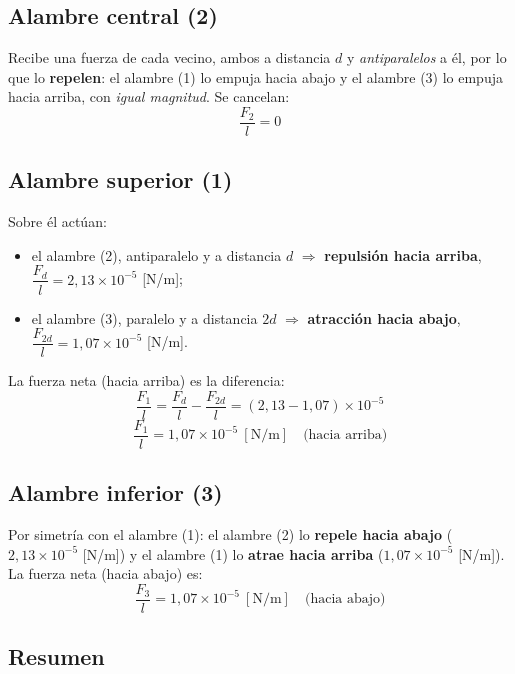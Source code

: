 \documentclass[12pt,letterpaper]{article}
\begin{document}
\subsection*{Alambre central (2)}

Recibe una fuerza de cada vecino, ambos a distancia $d$ y \emph{antiparalelos} a \'el, por lo que
lo \textbf{repelen}: el alambre (1) lo empuja hacia abajo y el alambre (3) lo empuja hacia arriba,
con \emph{igual magnitud}. Se cancelan:
\[
    \boxed{\frac{F_2}{l} = 0}
\]

\subsection*{Alambre superior (1)}

Sobre \'el act\'uan:
\begin{itemize}\setlength\itemsep{1pt}
    \item el alambre (2), antiparalelo y a distancia $d$ $\Rightarrow$ \textbf{repulsi\'on hacia
          arriba}, $\dfrac{F_d}{l}=2{,}13\times10^{-5}$ [N/m];
    \item el alambre (3), paralelo y a distancia $2d$ $\Rightarrow$ \textbf{atracci\'on hacia abajo},
          $\dfrac{F_{2d}}{l}=1{,}07\times10^{-5}$ [N/m].
\end{itemize}
La fuerza neta (hacia arriba) es la diferencia:
\[
    \frac{F_1}{l} = \frac{F_d}{l} - \frac{F_{2d}}{l}
    = (2{,}13 - 1{,}07)\times10^{-5}
\]
\[
    \boxed{\frac{F_1}{l} = 1{,}07\times10^{-5}\ [\text{N/m}]\quad\text{(hacia arriba)}}
\]

\subsection*{Alambre inferior (3)}

Por simetr\'ia con el alambre (1): el alambre (2) lo \textbf{repele hacia abajo}
($2{,}13\times10^{-5}$ [N/m]) y el alambre (1) lo \textbf{atrae hacia arriba}
($1{,}07\times10^{-5}$ [N/m]). La fuerza neta (hacia abajo) es:
\[
    \boxed{\frac{F_3}{l} = 1{,}07\times10^{-5}\ [\text{N/m}]\quad\text{(hacia abajo)}}
\]

\subsection*{Resumen}
\end{document}
